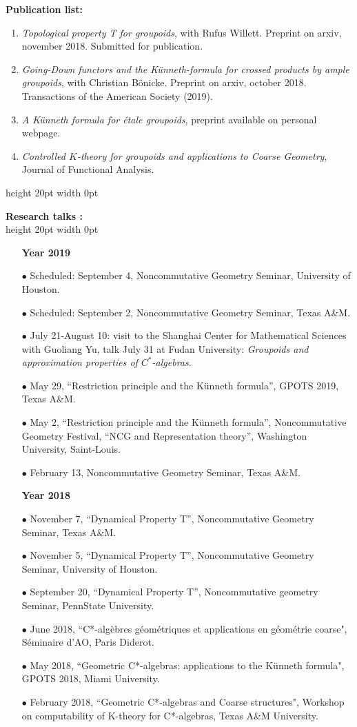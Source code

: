 \documentclass[a4paper,11pt]{article}
\newcommand\espace{\vrule height 20pt width 0pt}
\begin{document}
\textbf{Publication list:} 
\begin{enumerate}
\item \textit{Topological property T for groupoids}, with Rufus Willett. Preprint on arxiv, november 2018. Submitted for publication.
\item \textit{Going-Down functors and the Künneth-formula for crossed products by ample groupoids}, with Christian Bönicke. Preprint on arxiv, october 2018. Transactions of the American Society (2019).
\item \textit{A K\"{u}nneth formula for \'etale groupoids}, preprint available on personal webpage.
\item \textit{Controlled $K$-theory for groupoids and applications to Coarse Geometry}, Journal of Functional Analysis. 
\end{enumerate}
\espace

\textbf{Research talks :}\\
\espace
\begin{itemize}
\item[\textbf{Year 2019}]
\item[$\bullet$] Scheduled: September 4, Noncommutative Geometry Seminar, University of Houston.
\item[$\bullet$] Scheduled: September 2, Noncommutative Geometry Seminar, Texas A\&M.
\item[$\bullet$] July 21-August 10: visit to the Shanghai Center for Mathematical Sciences with Guoliang Yu, talk July 31 at Fudan University: \textit{Groupoids and approximation properties of $C^*$-algebras}. 
\item[$\bullet$] May 29, ``Restriction principle and the Künneth formula'', GPOTS 2019, Texas A\&M.
\item[$\bullet$] May 2, ``Restriction principle and the Künneth formula'', Noncommutative Geometry Festival, ``NCG and Representation theory'', Washington University, Saint-Louis.
\item[$\bullet$] February 13, Noncommutative Geometry Seminar, Texas A\&M.
\end{itemize}

\begin{itemize}
\item[\textbf{Year 2018}]
\item[$\bullet$] November 7, ``Dynamical Property T'', Noncommutative Geometry Seminar, Texas A\&M.
\item[$\bullet$] November 5, ``Dynamical Property T'', Noncommutative Geometry Seminar, University of Houston.
\item[$\bullet$] September 20, ``Dynamical Property T'', Noncommutative geometry Seminar, PennState University.
\item[$\bullet$] June 2018, ``C*-alg\`ebres g\'eom\'etriques et applications en g\'eom\'etrie coarse", S\'eminaire d'AO, Paris Diderot.
\item[$\bullet$] May 2018, ``Geometric C*-algebras: applications to the K\"unneth formula", GPOTS 2018, Miami University.
\item[$\bullet$] February 2018, ``Geometric C*-algebras and Coarse structures", Workshop on computability of K-theory for C*-algebras, Texas A\&M University.
\end{itemize}
\end{document}
